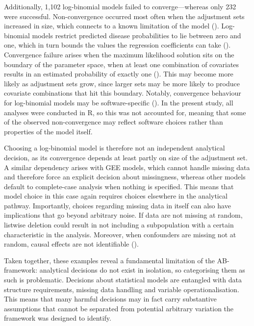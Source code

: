 \documentclass[
  man,
  floatsintext,
  longtable,
  nolmodern,
  notxfonts,
  notimes,
  colorlinks=true,linkcolor=blue,citecolor=blue,urlcolor=blue]{apa7}
\begin{document}
Additionally, 1,102 log-binomial models failed to converge---whereas
only 232 were successful. Non-convergence occurred most often when the
adjustment sets increased in size, which connects to a known limitation
of the model ().
Log-binomial models restrict predicted disease probabilities to lie
between zero and one, which in turn bounds the values the regression
coefficients can take
().
Convergence failure arises when the maximum likelihood solution sits on
the boundary of the parameter space, when at least one combination of
covariates results in an estimated probability of exactly one
(). This may become
more likely as adjustment sets grow, since larger sets may be more
likely to produce covariate combinations that hit this boundary.
Notably, convergence behaviour for log-binomial models may be
software-specific
().
In the present study, all analyses were conducted in R, so this was not
accounted for, meaning that some of the observed non-convergence may
reflect software choices rather than properties of the model itself.

Choosing a log-binomial model is therefore not an independent analytical
decision, as its convergence depends at least partly on size of the
adjustment set. A similar dependency arises with GEE models, which
cannot handle missing data and therefore force an explicit decision
about missingness, whereas other models default to complete-case
analysis when nothing is specified. This means that model choice in this
case again requires choices elsewhere in the analytical pathway.
Importantly, choices regarding missing data in itself can also have
implications that go beyond arbitrary noise. If data are not missing at
random, listwise deletion could result in not including a subpopulation
with a certain characteristic in the analysis. Moreover, when
confounders are missing not at random, causal effects are not
identifiable ().

Taken together, these examples reveal a fundamental limitation of the
AB-framework: analytical decisions do not exist in isolation, so
categorising them as such is problematic. Decisions about statistical
models are entangled with data structure requirements, missing data
handling and variable operationalisation. This means that many harmful
decisions may in fact carry substantive assumptions that cannot be
separated from potential arbitrary variation the framework was designed
to identify.
\end{document}

